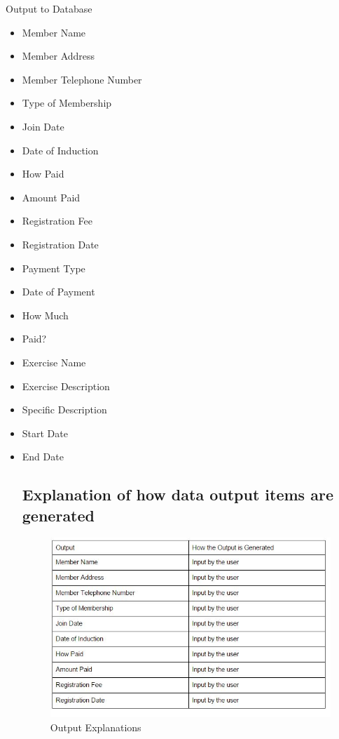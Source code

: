 Output to Database

\begin{itemize}
    \item Member Name
    \item Member Address
    \item Member Telephone Number
    \item Type of Membership
    \item Join Date
    \item Date of Induction
    \item How Paid
    \item Amount Paid
    \item Registration Fee
    \item Registration Date
    \item Payment Type
    \item Date of Payment
    \item How Much
    \item Paid?
    \item Exercise Name
    \item Exercise Description
    \item Specific Description
    \item Start Date
    \item End Date

\subsection{Explanation of how data output items are generated}

\begin{figure}[H]
    \includegraphics[width=\textwidth]{Outputexplanations1.JPG}
    \caption{Output Explanations} \label{fig:Output Explanations}
\end{figure}


\end{itemize}
